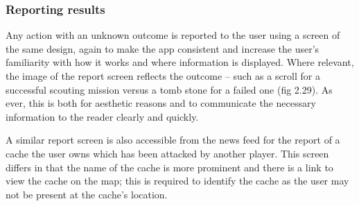 \subsubsection{Reporting results}

Any action with an unknown outcome is reported to the user using a screen of the same design, again to make the app consistent and increase the user’s familiarity with how it works and where information is displayed. Where relevant, the image of the report screen reflects the outcome – such as a scroll for a successful scouting mission versus a tomb stone for a failed one (fig 2.29). As ever, this is both for aesthetic reasons and to communicate the necessary information to the reader clearly and quickly.

A similar report screen is also accessible from the news feed for the report of a cache the user owns which has been attacked by another player. This screen differs in that the name of the cache is more prominent and there is a link to view the cache on the map; this is required to identify the cache as the user may not be present at the cache’s location.

